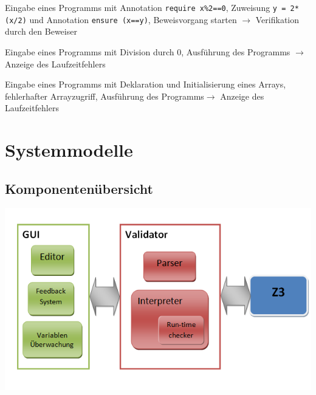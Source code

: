 \documentclass[a4paper,10pt]{article}
\begin{document}
\begin{T}{}{}
\end{T}\begin{T}{}{}Eingabe eines Programms mit Annotation \texttt{require x\%2==0}, Zuweisung \texttt{y = 2*(x/2)} und Annotation \texttt{ensure (x==y)}, Beweisvorgang starten $\to$ Verifikation durch den Beweiser
\end{T}\begin{T}{}{}Eingabe eines Programms mit Division durch 0, Ausf\"{u}hrung des Programms $\to$ Anzeige des Laufzeitfehlers
\end{T}\begin{T}{}{}Eingabe eines Programms mit Deklaration und Initialisierung eines Arrays, fehlerhafter Arrayzugriff, Ausf\"{u}hrung des Programms$\to$ Anzeige des Laufzeitfehlers
\end{T}

\section{Systemmodelle}
\subsection{Komponenten\"{u}bersicht}
\includegraphics[width=\textwidth]{images/overview.png}
\end{document}
